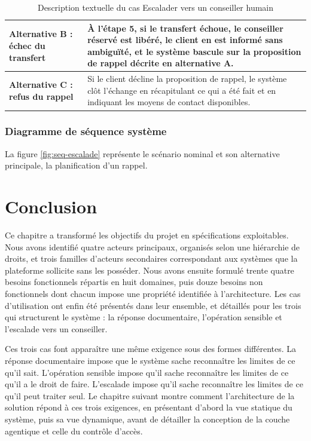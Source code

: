 \begin{table}[H]
\begin{tabular}{|p{3.0cm}|p{11.5cm}|}
\hline
\textbf{Alternative B : échec du transfert} & À l'étape 5, si le transfert échoue, le conseiller réservé est libéré, le client en est informé sans ambiguïté, et le système bascule sur la proposition de rappel décrite en alternative A. \\
\hline
\textbf{Alternative C : refus du rappel} & Si le client décline la proposition de rappel, le système clôt l'échange en récapitulant ce qui a été fait et en indiquant les moyens de contact disponibles. \\
\hline
\end{tabular}
\caption{Description textuelle du cas Escalader vers un conseiller humain}
\label{tab:cu-escalade}
\end{table}

\subsubsection{Diagramme de séquence système}

La figure \ref{fig:seq-escalade} représente le scénario nominal et son alternative principale, la planification d'un rappel.


\section*{Conclusion}

Ce chapitre a transformé les objectifs du projet en spécifications exploitables. Nous avons identifié quatre acteurs principaux, organisés selon une hiérarchie de droits, et trois familles d'acteurs secondaires correspondant aux systèmes que la plateforme sollicite sans les posséder. Nous avons ensuite formulé trente quatre besoins fonctionnels répartis en huit domaines, puis douze besoins non fonctionnels dont chacun impose une propriété identifiée à l'architecture. Les cas d'utilisation ont enfin été présentés dans leur ensemble, et détaillés pour les trois qui structurent le système : la réponse documentaire, l'opération sensible et l'escalade vers un conseiller.

Ces trois cas font apparaître une même exigence sous des formes différentes. La réponse documentaire impose que le système sache reconnaître les limites de ce qu'il sait. L'opération sensible impose qu'il sache reconnaître les limites de ce qu'il a le droit de faire. L'escalade impose qu'il sache reconnaître les limites de ce qu'il peut traiter seul. Le chapitre suivant montre comment l'architecture de la solution répond à ces trois exigences, en présentant d'abord la vue statique du système, puis sa vue dynamique, avant de détailler la conception de la couche agentique et celle du contrôle d'accès.
